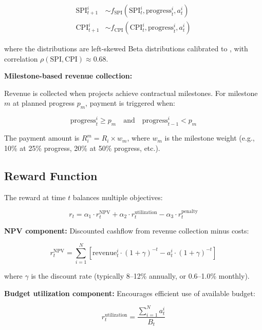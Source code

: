 \begin{align}
\text{SPI}_{t+1}^i &\sim f_{\text{SPI}}(\text{SPI}_t^i, \text{progress}_t^i, a_t^i) \\
\text{CPI}_{t+1}^i &\sim f_{\text{CPI}}(\text{CPI}_t^i, \text{progress}_t^i, a_t^i)
\end{align}

where the distributions are left-skewed Beta distributions calibrated to \citet{merrow2011industrial}, with correlation $\rho(\text{SPI}, \text{CPI}) \approx 0.68$.

\textbf{Milestone-based revenue collection:}

Revenue is collected when projects achieve contractual milestones. For milestone $m$ at planned progress $p_m$, payment is triggered when:

\begin{equation}
\text{progress}_t^i \geq p_m \quad \text{and} \quad \text{progress}_{t-1}^i < p_m
\end{equation}

The payment amount is $R_i^m = R_i \times w_m$, where $w_m$ is the milestone weight (e.g., 10\% at 25\% progress, 20\% at 50\% progress, etc.).

\subsection{Reward Function}

The reward at time $t$ balances multiple objectives:

\begin{equation}
r_t = \alpha_1 \cdot r_t^{\text{NPV}} + \alpha_2 \cdot r_t^{\text{utilization}} - \alpha_3 \cdot r_t^{\text{penalty}}
\end{equation}

\textbf{NPV component:} Discounted cashflow from revenue collection minus costs:

\begin{equation}
r_t^{\text{NPV}} = \sum_{i=1}^N \left[\text{revenue}_t^i \cdot (1+\gamma)^{-t} - a_t^i \cdot (1+\gamma)^{-t}\right]
\end{equation}

where $\gamma$ is the discount rate (typically 8--12\% annually, or 0.6--1.0\% monthly).

\textbf{Budget utilization component:} Encourages efficient use of available budget:

\begin{equation}
r_t^{\text{utilization}} = \frac{\sum_{i=1}^N a_t^i}{B_t}
\end{equation}


